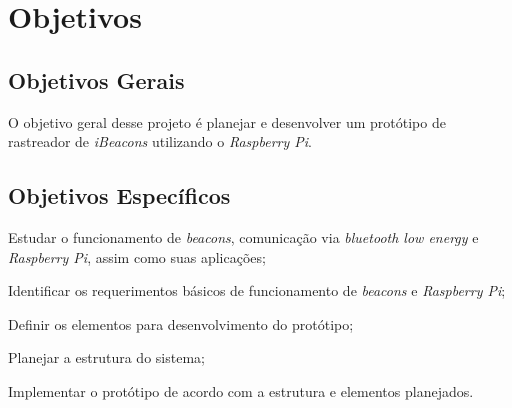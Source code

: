 \chapter{Objetivos}\label{cap:objetivos-justificativa}

\section{Objetivos Gerais}\label{sec:objetivos-gerais}

O objetivo geral desse projeto é planejar e desenvolver um protótipo de rastreador de \textit{iBeacons} utilizando o \textit{Raspberry Pi}.


\section{Objetivos Específicos}\label{sec:objetivos-especificos}

\begin{alineas}
	\item Estudar o funcionamento de \textit{beacons}, comunicação via \textit{bluetooth low energy} e \textit{Raspberry Pi}, assim como suas aplicações;
	\item Identificar os requerimentos básicos de funcionamento de \textit{beacons} e \textit{Raspberry Pi};
	\item Definir os elementos para desenvolvimento do protótipo;
	\item Planejar a estrutura do sistema;
	\item Implementar o protótipo de acordo com a estrutura e elementos planejados.
\end{alineas}

